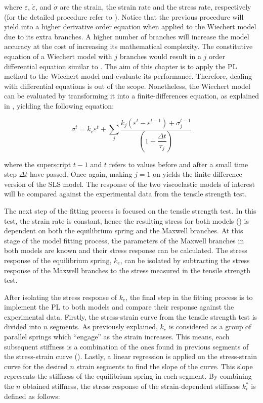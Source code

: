 \noindent where $\varepsilon$, $\dot{\varepsilon}$, and $\dot{\sigma}$ are the strain, the strain rate and the stress rate, respectively (for the detailed procedure refer to \cite{roylance2001engineering}). Notice that the previous procedure will yield into a higher derivative order equation when applied to the Wiechert model due to its extra branches. A higher number of branches will increase the model accuracy at the cost of increasing its mathematical complexity. The constitutive equation of a Wiechert model with $j$ branches would result in a $j$ order differential equation similar to . The aim of this chapter is to apply the PL method to the Wiechert model and evaluate its performance. Therefore, dealing with differential equations is out of the scope. Nonetheless, the Wiechert model can be evaluated by transforming it into a finite-differences equation, as explained in \cite{roylance2001engineering}, yielding the following equation:

\begin{equation}
    \label{eq4}
    \sigma^t = k_e\varepsilon^t + \sum_j \frac{k_j(\varepsilon^t - \varepsilon^{t-1}) + \sigma_j^{t-1}}{ \left( 1+\dfrac{\Delta t}{\tau_j} \right) }
\end{equation}

\noindent where the superscript $t-1$ and $t$ refers to values before and after a small time step $\Delta t$ have passed. Once again, making $j=1$ on  yields the finite difference version of the SLS model. The response of the two viscoelastic models of interest will be compared against the experimental data from the tensile strength test.

The next step of the fitting process is focused on the tensile strength test. In this test, the strain rate is constant, hence the resulting stress for both models () is dependent on both the equilibrium spring and the Maxwell branches. At this stage of the model fitting process, the parameters of the Maxwell branches in both models are known and their stress response can be calculated. The stress response of the equilibrium spring, $k_e$, can be isolated by subtracting the stress response of the Maxwell branches to the stress measured in the tensile strength test. 

After isolating the stress response of $k_e$, the final step in the fitting process is to implement the PL to both models and compare their response against the experimental data. Firstly, the stress-strain curve from the tensile strength test is divided into $n$ segments. As previously explained, $k_e$ is considered as a group of parallel springs which ``engage'' as the strain increases. This means, each subsequent stiffness is a combination of the ones found in previous segments of the stress-strain curve ().  Lastly, a linear regression is applied on the stress-strain curve for the desired $n$ strain segments to find the slope of the curve. This slope represents the stiffness of the equilibrium spring in each segment. By combining the $n$ obtained stiffness, the stress response of the strain-dependent stiffness $k_i^*$ is defined as follows:

